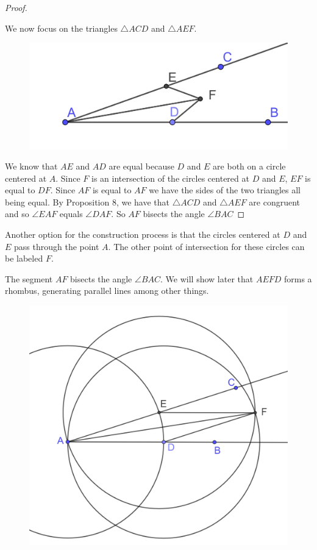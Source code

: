 \documentclass[
]{book}
\theoremstyle{definition}
\theoremstyle{definition}
\theoremstyle{definition}
\theoremstyle{definition}
\theoremstyle{remark}
\begin{document}
\begin{proof}
\begin{figure}
{}

\end{figure}

We now focus on the triangles \(\triangle ACD\) and \(\triangle AEF\).

\begin{figure}

{\centering \includegraphics[width=0.4\linewidth]{images/Prop9d} 

}

\end{figure}

We know that \(AE\) and \(AD\) are equal because \(D\) and \(E\) are both on a circle centered at \(A\). Since \(F\) is an intersection of the circles centered at \(D\) and \(E\), \(EF\) is equal to \(DF\). Since \(AF\) is equal to \(AF\) we have the sides of the two triangles all being equal. By Proposition 8, we have that \(\triangle ACD\) and \(\triangle AEF\) are congruent and so \(\angle EAF\) equals \(\angle DAF\). So \(AF\) bisects the angle \(\angle BAC\)
\end{proof}

Another option for the construction process is that the circles centered at \(D\) and \(E\) pass through the point \(A\). The other point of intersection for these circles can be labeled \(F\).

The segment \(AF\) bisects the angle \(\angle BAC\). We will show later that \(AEFD\) forms a rhombus, generating parallel lines among other things.

\begin{figure}

{\centering \includegraphics[width=0.4\linewidth]{images/Prop9e} 

}

\end{figure}
\end{document}
